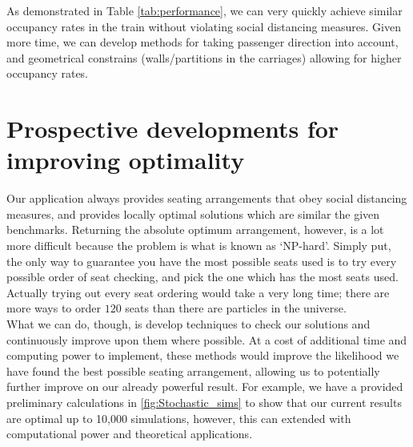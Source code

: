 \documentclass[11pt,a4paper]{article}
\begin{document}
As demonstrated in Table \ref{tab:performance}, we can very quickly achieve similar occupancy rates in the train without violating social distancing measures. Given more time, we can develop methods for taking passenger direction into account, and geometrical constrains (walls/partitions in the carriages) allowing for higher occupancy rates.

\section*{Prospective developments for improving optimality}
Our application always provides seating arrangements that obey social distancing measures, and provides locally optimal solutions which are similar the given benchmarks. Returning the  absolute optimum arrangement, however, is a lot more difficult because the problem is what is known as `NP-hard'.  Simply put, the only way to guarantee you have the most possible seats used is to try every possible order of seat checking, and pick the one which has the most seats used. Actually trying out every seat ordering would take a very long time; there are more ways to order $120$ seats than there are particles in the universe.\\

What we can do, though, is develop techniques to check our solutions and continuously improve upon them where possible. At a cost of additional time and computing power to implement, these methods would improve the likelihood we have found the best possible seating arrangement, allowing us to potentially further improve on our already powerful result. For example, we have a provided preliminary calculations in \autoref{fig:Stochastic_sims} to show that our current results are optimal up to 10,000 simulations, however, this can extended with computational power and theoretical applications.\\
\end{document}
